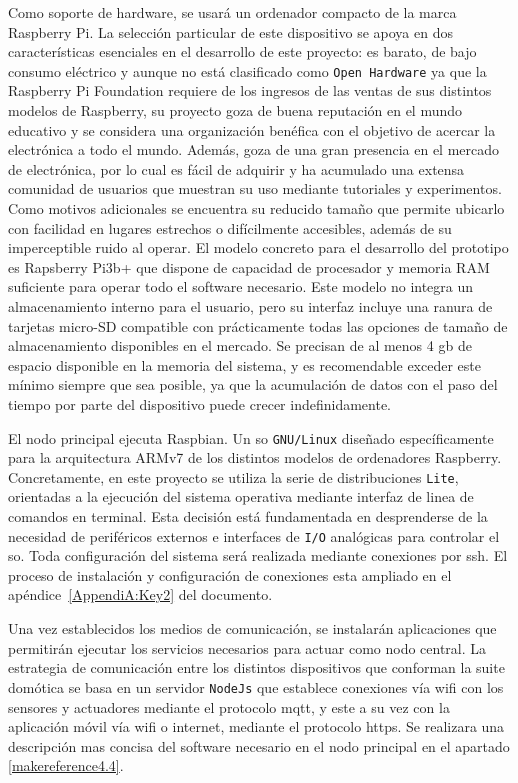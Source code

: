 Como soporte de hardware, se usará un ordenador compacto de la marca Raspberry Pi. La selección particular de este dispositivo se apoya en dos características esenciales en el desarrollo de este proyecto: es barato, de bajo consumo eléctrico y aunque no está clasificado como \verb|Open Hardware| ya que la Raspberry Pi Foundation requiere de los ingresos de las ventas de sus distintos modelos de Raspberry, su proyecto goza de buena reputación en el mundo educativo y se considera una organización benéfica con el objetivo de acercar la electrónica a todo el mundo. Además, goza de una gran presencia en el mercado de electrónica, por lo cual es fácil de adquirir y ha acumulado una extensa comunidad de usuarios que muestran su uso mediante tutoriales y experimentos. Como motivos adicionales se encuentra su reducido tamaño que permite ubicarlo con facilidad en lugares estrechos o difícilmente accesibles, además de su imperceptible ruido al operar. El modelo concreto para el desarrollo del prototipo es Rapsberry Pi3b+ que dispone de capacidad de procesador y memoria RAM suficiente para operar todo el software necesario. Este modelo no integra un almacenamiento interno para el usuario, pero su interfaz incluye una ranura de tarjetas micro-SD compatible con prácticamente todas las opciones de tamaño de almacenamiento disponibles en el mercado. Se precisan de al menos 4 \gls{gb} de espacio disponible en la memoria del sistema, y es recomendable exceder este mínimo siempre que sea posible, ya que la acumulación de datos con el paso del tiempo por parte del dispositivo puede crecer indefinidamente.

\vspace{1cm}

El nodo principal ejecuta Raspbian. Un \gls{so} \verb|GNU/Linux| diseñado específicamente para la arquitectura ARMv7 de los distintos modelos de ordenadores Raspberry. Concretamente, en este proyecto se utiliza la serie de distribuciones \verb|Lite|, orientadas a la ejecución del sistema operativa mediante interfaz de linea de comandos en terminal. Esta decisión está fundamentada en desprenderse de la necesidad de periféricos externos e interfaces de \verb|I/O| analógicas para controlar el \gls{so}. Toda configuración del sistema será realizada mediante conexiones por \gls{ssh}. El proceso de instalación y configuración de conexiones esta ampliado en el apéndice~\ref{AppendiA:Key2} del documento.

\vspace{1cm}

Una vez establecidos los medios de comunicación, se instalarán aplicaciones que permitirán ejecutar los servicios necesarios para actuar como nodo central. La estrategia de comunicación entre los distintos dispositivos que conforman la suite domótica se basa en un servidor \verb|NodeJs| que establece conexiones vía \gls{wifi} con los sensores y actuadores mediante el protocolo \gls{mqtt}, y este a su vez con la aplicación móvil vía \gls{wifi} o internet, mediante el protocolo \gls{https}. Se realizara una descripción mas concisa del software necesario en el nodo principal en el apartado \ref{makereference4.4}.



